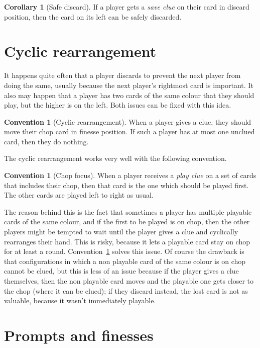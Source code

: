 \documentclass[a4paper]{article}
\theoremstyle{plain}
\theoremstyle{definition}
\newtheorem{corollary}[theorem]{Corollary}
\newtheorem{convention}[theorem]{Convention}
\begin{document}
\begin{corollary}[Safe discard]
	If a player gets a \textit{save clue} on their card in discard position, then the card on its left can be safely discarded.
\end{corollary}

\section{Cyclic rearrangement}

It happens quite often that a player discards to prevent the next player from doing the same, usually because the next player's rightmost card is important. It also may happen that a player has two cards of the same colour that they should play, but the higher is on the left. Both issues can be fixed with this idea.

\begin{convention}[Cyclic rearrangement]
	When a player gives a clue, they should move their chop card in finesse position. If such a player has at most one unclued card, then they do nothing.
\end{convention}

 The cyclic rearrangement works very well with the following convention.

\begin{convention}[Chop focus]
	\label{chop-focus}
	When a player receives a \emph{play clue} on a set of cards that includes their chop, then that card is the one which should be played first. The other cards are played left to right as usual.
\end{convention}

The reason behind this is the fact that sometimes a player has multiple playable cards of the same colour, and if the first to be played is on chop, then the other players might be tempted to wait until the player gives a clue and cyclically rearranges their hand. This is risky, because it lets a playable card stay on chop for at least a round. Convention~\ref{chop-focus} solves this issue. Of course the drawback is that configurations in which a non playable card of the same colour is on chop cannot be clued, but this is less of an issue because if the player gives a clue themselves, then the non playable card moves and the playable one gets closer to the chop (where it can be clued); if they discard instead, the lost card is not as valuable, because it wasn't immediately playable.

\section{Prompts and finesses}
\end{document}

